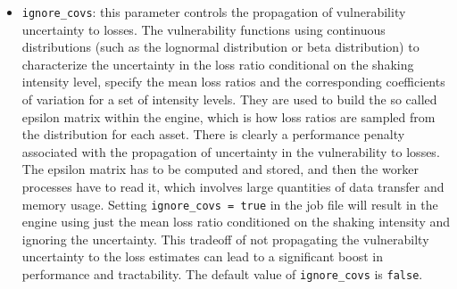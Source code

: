 \begin{itemize}
  \item \Verb+ignore_covs+: this parameter controls the propagation of 
    vulnerability uncertainty to losses. The vulnerability functions using 
    continuous distributions (such as the lognormal distribution or beta 
    distribution) to characterize the uncertainty in the loss ratio 
    conditional on the shaking intensity level, specify the mean loss ratios 
    and the corresponding coefficients of variation for a set of intensity 
    levels. They are used to build the so called epsilon matrix within the 
    engine, which is how loss ratios are sampled from the distribution for 
    each asset. There is clearly a performance penalty associated with the 
    propagation of uncertainty in the vulnerability to losses. The epsilon 
    matrix has to be computed and stored, and then the worker processes have 
    to read it, which involves large quantities of data transfer and memory 
    usage. Setting \Verb+ignore_covs = true+ in the job file will result in 
    the engine using just the mean loss ratio conditioned on the shaking 
    intensity and ignoring the uncertainty. This tradeoff of not propagating 
    the vulnerabilty uncertainty to the loss estimates can lead to a 
    significant boost in performance and tractability. The default value of 
    \Verb+ignore_covs+ is \Verb+false+. 

\end{itemize}
